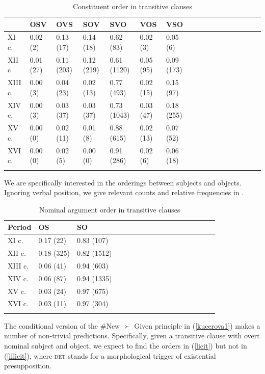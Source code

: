 \documentclass[output=paper,modfonts,nonflat]{langsci/langscibook}
\begin{document}
\begin{table}[H]
\centering
\begin{tabular}{lllllllllllllllll}
  \lsptoprule
 & OSV & OVS & SOV & SVO & VOS & VSO \\
  \midrule
XI c. &  0.02 (2) & 0.13 (17) & 0.14 (18) & 0.62 (83) & 0.02 (3) & 0.05 (6) \\
  XII c & 0.01 (27) & 0.11 (203) & 0.12 (219) & 0.61 (1120) &  0.05 (95) & 0.09 (173) \\
  XIII c. &  0.00 (3) & 0.04 (23) & 0.02 (13) & 0.77 (493) & 0.02 (15) & 0.15 (97) \\
  XIV c. &  0.00 (3)  &  0.03 (37) & 0.03 (37) & 0.73 (1043) & 0.03 (47) &0.18 (255) \\
  XV c. &  0.00 (0) &  0.02 (11)  &  0.01 (8) & 0.88 (615) & 0.02 (13) & 0.07 (52) \\
  XVI c. &  0.00 (0) &  0.02 (5) & 0.00 (0) & 0.91 (286) &  0.02 (6) & 0.06 (18) \\
\lspbottomrule
\end{tabular}
\caption{Constituent order in transitive clauses}\label{table:orders1}
\end{table}

We are specifically interested in the orderings between subjects and objects. Ignoring verbal position, we give relevant counts and relative frequencies in .

\begin{table}[H]
\centering
\begin{tabular}{lllllllllllllllll}
  \lsptoprule
Period & OS & SO  \\
  \midrule
XI c. &  0.17 (22) & 0.83 (107) \\
XII c. & 0.18 (325) & 0.82 (1512) \\
XIII c. & 0.06 (41)  & 0.94 (603) \\
XIV c. & 0.06 (87) & 0.94 (1335) \\
XV c. & 0.03 (24) & 0.97 (675) \\
XVI c. & 0.03 (11) & 0.97 (304) \\
\lspbottomrule
\end{tabular}
\caption{Nominal argument order in transitive clauses}\label{table:orders2}
\end{table}

The conditional version of the \#New $\succ$ Given principle in (\ref{kucerova1}) makes a number of non-trivial predictions. Specifically, given a transitive clause with overt nominal subject and object, we expect to find the orders in (\ref{licit}) but not in (\ref{illicit}), where {\scshape det} stands for a morphological trigger of existential presupposition.
\end{document}
